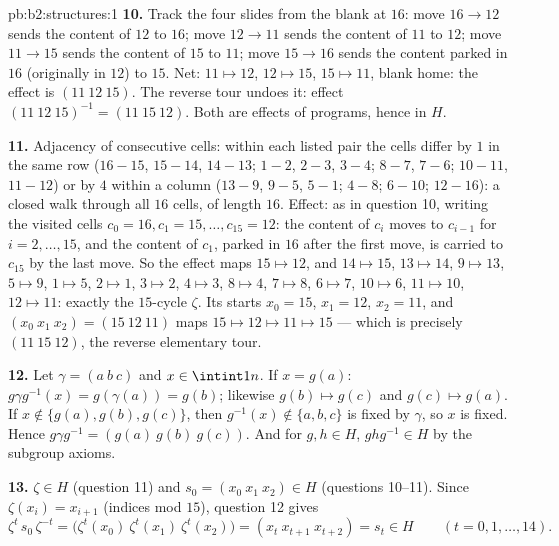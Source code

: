 \begin{solution}{pb:b2:structures:1}
\textbf{10.} Track the four slides from the blank at $16$: move
$16 \to 12$ sends the content of $12$ to $16$; move $12 \to 11$
sends the content of $11$ to $12$; move $11 \to 15$ sends the
content of $15$ to $11$; move $15 \to 16$ sends the content
parked in $16$ (originally in $12$) to $15$. Net: $11 \mapsto
12$, $12 \mapsto 15$, $15 \mapsto 11$, blank home: the effect is
$(11\ 12\ 15)$. The reverse tour undoes it: effect $(11\ 12\
15)^{-1} = (11\ 15\ 12)$. Both are effects of programs, hence in
$H$.

\textbf{11.} Adjacency of consecutive cells: within each listed
pair the cells differ by $1$ in the same row ($16{-}15$,
$15{-}14$, $14{-}13$; $1{-}2$, $2{-}3$, $3{-}4$; $8{-}7$,
$7{-}6$; $10{-}11$, $11{-}12$) or by $4$ within a column
($13{-}9$, $9{-}5$, $5{-}1$; $4{-}8$; $6{-}10$; $12{-}16$): a
closed walk through all $16$ cells, of length $16$. Effect: as
in question 10, writing the visited cells $c_0 = 16, c_1 = 15,
\dots, c_{15} = 12$: the content of $c_i$ moves to $c_{i-1}$ for
$i = 2, \dots, 15$, and the content of $c_1$, parked in $16$
after the first move, is carried to $c_{15}$ by the last move.
So the effect maps $15 \mapsto 12$, and $14 \mapsto 15$, $13
\mapsto 14$, $9 \mapsto 13$, $5 \mapsto 9$, $1 \mapsto 5$, $2
\mapsto 1$, $3 \mapsto 2$, $4 \mapsto 3$, $8 \mapsto 4$, $7
\mapsto 8$, $6 \mapsto 7$, $10 \mapsto 6$, $11 \mapsto 10$, $12
\mapsto 11$: exactly the $15$-cycle $\zeta$. Its  
starts $x_0 = 15$, $x_1 = 12$, $x_2 = 11$, and $(x_0\ x_1\ x_2)
= (15\ 12\ 11)$ maps $15 \mapsto 12 \mapsto 11 \mapsto 15$ ---
which is precisely $(11\ 15\ 12)$, the reverse elementary tour.

\textbf{12.} Let $\gamma = (a\ b\ c)$ and $x \in \intint1n$. If
$x = g(a)$: $g\gamma g^{-1}(x) = g(\gamma(a)) = g(b)$; likewise
$g(b) \mapsto g(c)$ and $g(c) \mapsto g(a)$. If $x \notin
\{g(a), g(b), g(c)\}$, then $g^{-1}(x) \notin \{a,b,c\}$ is
fixed by $\gamma$, so $x$ is fixed. Hence $g\gamma g^{-1} =
(g(a)\ g(b)\ g(c))$. And for $g, h \in H$, $ghg^{-1} \in H$ by
the subgroup axioms.

\textbf{13.} $\zeta \in H$ (question 11) and $s_0 = (x_0\ x_1\
x_2) \in H$ (questions 10--11). Since $\zeta(x_i) = x_{i+1}$
(indices mod $15$), question 12 gives
\[
\zeta^{t}\,s_0\,\zeta^{-t}
= \bigl(\zeta^t(x_0)\ \zeta^t(x_1)\ \zeta^t(x_2)\bigr)
= (x_t\ x_{t+1}\ x_{t+2}) = s_t \in H
\qquad (t = 0, 1, \dots, 14).
\]


\end{solution}

